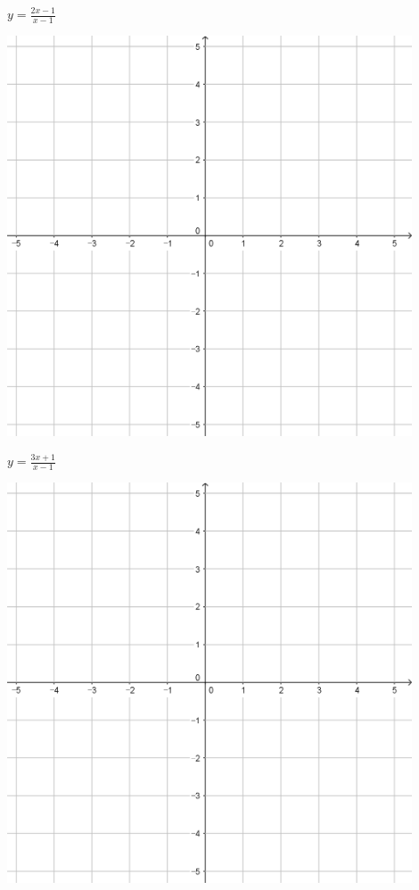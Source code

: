 \documentclass{oblivoir}
\begin{document}
\begin{minipage}{0.45\textwidth}\centering
\(y=\frac{2x-1}{x-1}\)
\par\bigskip\includegraphics[width=0.9\textwidth]{55}
\end{minipage}
\begin{minipage}{0.45\textwidth}\centering
\(y=\frac{3x+1}{x-1}\)
\par\bigskip\includegraphics[width=0.9\textwidth]{55}
\end{minipage}\bigskip\bigskip\par
\end{document}

